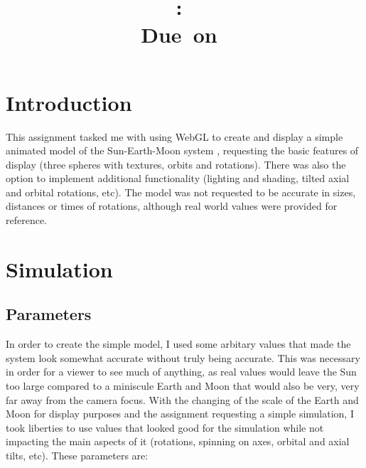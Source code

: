 \documentclass[12pt]{article}
\title{
\vspace{2in}
\textmd{\textbf{\hmwkClass:\ \hmwkTitle}}\\
\normalsize\vspace{0.1in}\small{Due\ on\ \hmwkDueDate}\\
\vspace{3in}
}
\author{\textbf{\hmwkAuthorName}}
\date{} %
\begin{document}
\maketitle



\newpage
\tableofcontents
\newpage



\section{Introduction}
This assignment tasked me with using WebGL to create and display a simple animated model of the Sun-Earth-Moon system \cite{assignment}, requesting the basic features of display (three spheres with textures, orbits and rotations). There was also the option to implement additional functionality (lighting and shading, tilted axial and orbital rotations, etc). The model was not requested to be accurate in sizes, distances or times of rotations, although real world values were provided for reference.

\section{Simulation}
\subsection{Parameters}
In order to create the simple model, I used some arbitary values that made the system look somewhat accurate without truly being accurate. This was necessary in order for a viewer to see much of anything, as real values would leave the Sun too large compared to a miniscule Earth and Moon that would also be very, very far away from the camera focus. With the changing of the scale of the Earth and Moon for display purposes and the assignment requesting a simple simulation, I took liberties to use values that looked good for the simulation while not impacting the main aspects of it (rotations, spinning on axes, orbital and axial tilts, etc). These parameters are:
\end{document}
